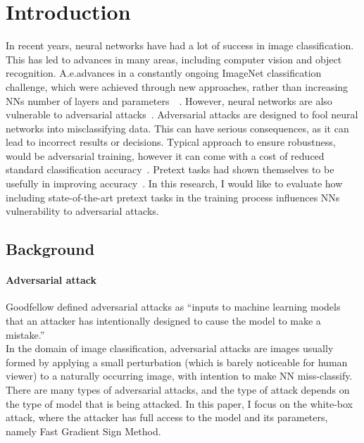 \section{Introduction}

In recent years, neural networks have had a lot of success in image classification.
This has led to advances in many areas, including computer vision and object recognition.
A.e.advances in a constantly ongoing ImageNet classification challenge, which were achieved
through new approaches,
rather than increasing NNs number of layers and parameters~\cite{russakovsky2015imagenet,DBLP:journals/corr/abs-1905-11946}~.
However, neural networks are also vulnerable to adversarial attacks~\cite{ilyas2019adversarial}.
Adversarial attacks are designed to fool neural networks into misclassifying data.
This can have serious consequences, as it can lead to incorrect results or decisions.
Typical approach to ensure robustness, would be adversarial training, however it can come with a cost of
reduced standard classification accuracy~\cite{https://doi.org/10.48550/arxiv.1805.12152}.
Pretext tasks had shown themselves to be usefully in improving accuracy~\cite{kolesnikov2019revisiting}.
In this research, I would like to evaluate how including state-of-the-art pretext tasks in the training process
influences NNs vulnerability to adversarial attacks.

\subsection{Background}

\paragraph{Adversarial attack}
Goodfellow defined adversarial attacks as “inputs to machine learning models that an
attacker has intentionally designed to cause the model to make a mistake.”
~\cite{DBLP:journals/corr/abs-1802-08195} \\
In the domain of image classification, adversarial attacks are images usually formed by applying a small perturbation
(which is barely noticeable for human viewer) to a naturally occurring image, with intention to make NN miss-classify.
There are many types of adversarial attacks,
and the type of attack depends on the type of model that is being attacked.
In this paper, I focus on the white-box attack, where the attacker has full access to the model and its parameters,
namely Fast Gradient Sign Method.

